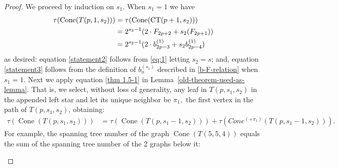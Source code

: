 \documentclass[10pt,reqno]{amsart}
\DeclareMathOperator{\Cone}{Cone}
\newcommand{\CT}[2]{\mathrm{CT}(#1,#2)}
\begin{document}
\begin{proof}
  We proceed by induction on $s_1.$ When $s_1 = 1$ we have 
\begin{align}
    \tau(\Cone(T(p,1,s_2) ))
                            & = \tau(\Cone(\CT{p+1}{s_2})) \notag \\
                            \label{statement2}
                            & = 2^{s_2-1}(2\cdot F_{2p+2} +s_2(F_{2p+1})) \\   
                            & = 2^{s_2-1}(2\cdot b_{2p-3}^{(1)} +s_2b_{2p-4}^{(1)})\label{statement3}
\end{align}
as desired: equation \eqref{statement2} follows from  \eqref{eq:1} letting $s_2 = s$; and, equation \eqref{statement3} follows from the definition of $b_n^{(s_1)}$ described in \eqref{b-F-relation} when $s_1 = 1.$ 
Next we apply equation \eqref{thm 1.5-1} in Lemma~\ref{old-theorem-used-as-lemma}.  That is, we select, without loss of generality, any leaf in $T(p,s_1,s_2)$ in the appended left star and let its unique neighbor be $\pi_1,$ the first vertex in the path of $T(p,s_1,s_2)$, obtaining:
\begin{align}
   \tau(\Cone(T(p,s_1,s_2) )) 
   &= \tau(\Cone(T(p,s_1-1,s_2) ))+ \tau(Cone^{(+\pi_1)}(T(p,s_1-1,s_2) )) \label{spanning_tree_equality}.   
    \end{align}
     For example, the spanning tree number of the graph $\Cone(T(5,5,4))$  equals the sum of the spanning tree number of the  2 graphs below it: 
\vspace{.1cm}
   
\begin{center}
\begin{figure}[H]
\end{figure}
\end{center}
\end{proof}
\end{document}

